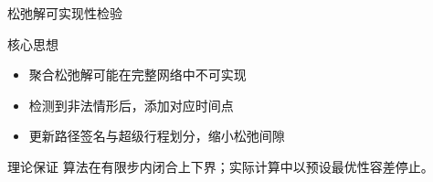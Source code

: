 \begin{frame}{松弛解可实现性检验}
\begin{block}{核心思想}
\begin{itemize}
    \item 聚合松弛解可能在完整网络中不可实现
    \item 检测到非法情形后，添加对应时间点
    \item 更新路径签名与超级行程划分，缩小松弛间隙
\end{itemize}
\end{block}

\vspace{0.4cm}
\begin{alertblock}{理论保证}
算法在有限步内闭合上下界；实际计算中以预设最优性容差停止。
\end{alertblock}
\end{frame}
